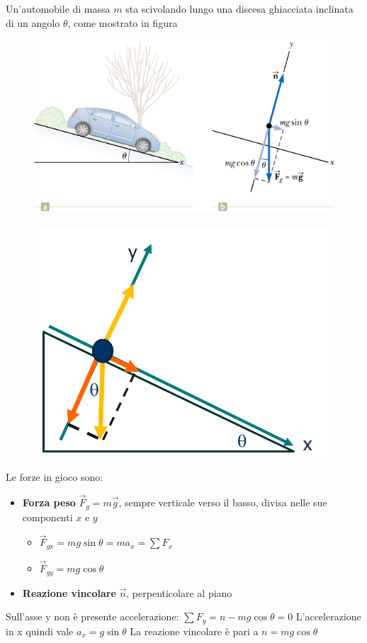 \documentclass[a4paper,11pt,oneside]{book}
\begin{document}
\noindent Un’automobile di massa $m$ sta scivolando lungo una discesa ghiacciata inclinata di un angolo $\theta$, come mostrato in figura
\begin{figure}[h]
    \centering
    \includegraphics[scale=0.45]{piano_inclinato} ~~
    \includegraphics[scale=0.2]{piano_inclinato_forze}
\end{figure}

\noindent Le forze in gioco sono:
\begin{itemize}
    \item \textbf{Forza peso} $\vec{F}_g = m\vec{g}$, sempre verticale verso il basso, divisa nelle sue componenti $x$ e $y$
    \begin{itemize}
        \item $\vec{F}_{gx} = mg \sin{\theta} = ma_x = \sum F_x$
        \item $\vec{F}_{gy} = mg \cos{\theta}$
    \end{itemize}
    \item \textbf{Reazione vincolare} $\vec{n}$, perpenticolare al piano
\end{itemize}
Sull'asse y non è presente accelerazione: $\sum F_y = n - mg \cos{\theta} = 0$ \newline
L'accelerazione in x quindi vale $a_x = g \sin{\theta}$ \newline
La reazione vincolare è pari a $n = mg \cos{\theta}$
\end{document}
